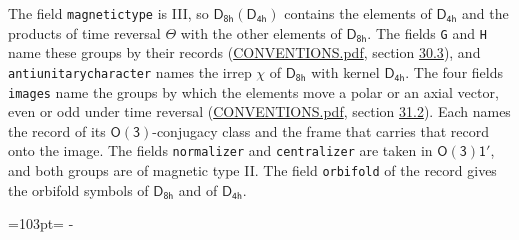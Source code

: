 \documentclass[10pt,a4paper]{article}
\newcommand{\needspace}[1]{\par\penalty-100\begingroup\dimen0=#1\relax\dimen2=\pagegoal
  \advance\dimen2-\pagetotal\ifdim\dimen0>\dimen2\relax\ifdim\dimen2>0pt\vfil\break\fi\fi
  \endgroup}
\numberwithin{equation}{section}
\newcommand{\grp}[1]{\mathsf{#1}}
\begin{document}
The field \texttt{magnetictype} is III, so $\grp{D_{8h}}(\grp{D_{4h}})$ contains the elements of $\grp{D_{4h}}$ and the products of time reversal $\varTheta$ with the other elements of $\grp{D_{8h}}$. The fields \texttt{G} and \texttt{H} name these groups by their records (\href{../../CONVENTIONS.pdf}{CONVENTIONS.pdf}, section \href{../../CONVENTIONS.pdf\#conv.30.3}{30.3}), and \texttt{antiunitarycharacter} names the irrep $\chi$ of $\grp{D_{8h}}$ with kernel $\grp{D_{4h}}$. The four fields \texttt{images} name the groups by which the elements move a polar or an axial vector, even or odd under time reversal (\href{../../CONVENTIONS.pdf}{CONVENTIONS.pdf}, section \href{../../CONVENTIONS.pdf\#conv.31.2}{31.2}). Each names the record of its $\grp{O(3)}$-conjugacy class and the frame that carries that record onto the image. The fields \texttt{normalizer} and \texttt{centralizer} are taken in $\grp{O(3)1'}$, and both groups are of magnetic type II. The field \texttt{orbifold} of the record gives the orbifold symbols of $\grp{D_{8h}}$ and of $\grp{D_{4h}}$.
\needspace{103pt}
\end{document}
